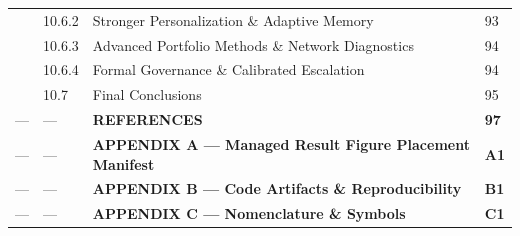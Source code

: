 \documentclass[11pt]{article}
\begin{document}
\begin{longtable}{C{0.8cm}C{1.2cm}L{9.7cm}C{1.2cm}}
 & 10.6.2 & Stronger Personalization \& Adaptive Memory & 93 \\
 & 10.6.3 & Advanced Portfolio Methods \& Network Diagnostics & 94 \\
 & 10.6.4 & Formal Governance \& Calibrated Escalation & 94 \\
 & 10.7 & Final Conclusions & 95 \\
--- & --- & \textbf{REFERENCES} & \textbf{97} \\
--- & --- & \textbf{APPENDIX A --- Managed Result Figure Placement Manifest} & \textbf{A1} \\
--- & --- & \textbf{APPENDIX B --- Code Artifacts \& Reproducibility} & \textbf{B1} \\
--- & --- & \textbf{APPENDIX C --- Nomenclature \& Symbols} & \textbf{C1} \\
\bottomrule
\end{longtable}
\normalsize

\clearpage
\end{document}
